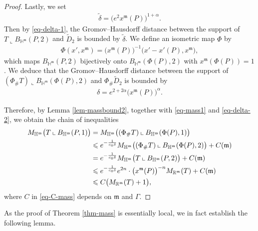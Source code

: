 \documentclass[11pt,reqno]{amsart}
\newcommand{\fm}{\mathfrak{m}}
\renewcommand{\leq}{\leqslant}
\theoremstyle{definition}
\numberwithin{equation}{section}
\begin{document}
\begin{proof}
    Lastly, we set
    \begin{align}
        \tilde \delta = \bigl(e^2 x^\fm(P)\bigr)^{1+\alpha}.
    \end{align}
    Then by \eqref{eq-delta-1}, the Gromov–Hausdorff distance between the support of $T \mathbin{\llcorner} B_{\mathbb{H}^\fm}(P, 2)$ and $\tilde D_2$ is bounded by $\tilde \delta$. We define an isometric map $\Phi$ by
    \begin{align}\label{eq-phi}
        \Phi (x', x^\fm) = \bigl(x^\fm(P)\bigr)^{-1}\bigl(x' - x'(P), x^\fm\bigr),
    \end{align}
    which maps $B_{\mathbb{H}^\fm}(P,2)$ bijectively onto $B_{\mathbb{H}^\fm}(\Phi(P),2)$ with $x^\fm(\Phi(P))=1$. We deduce that the Gromov–Hausdorff distance between the support of $(\Phi_\# T) \mathbin{\llcorner} B_{\mathbb{H}^\fm}(\Phi(P), 2)$ and $\Phi_\# \tilde D_2$ is bounded by
    \begin{align}\label{eq-delta-2}
        \delta = e^{2+2\alpha}\bigl(x^\fm(P)\bigr)^{\alpha}.
    \end{align}
    
    Therefore, by Lemma \ref{lem-massbound2}, together with \eqref{eq-mass1} and \eqref{eq-delta-2}, we obtain the chain of inequalities
    \begin{align}
        M_{\mathbb{H}^\fm}\bigl(T \mathbin{\llcorner} B_{\mathbb{H}^\fm}(P, 1)\bigr) & = M_{\mathbb{H}^\fm}\bigl((\Phi_\# T) \mathbin{\llcorner} B_{\mathbb{H}^\fm}(\Phi(P), 1)\bigr) \notag \\
        &\leq e^{-\frac{1}{c_0\delta}} M_{\mathbb{H}^\fm}\bigl((\Phi_\# T) \mathbin{\llcorner} B_{\mathbb{H}^\fm}(\Phi(P), 2)\bigr) + C(\fm) \notag \\
        &= e^{-\frac{1}{c_0\delta}} M_{\mathbb{H}^\fm}\bigl(T \mathbin{\llcorner} B_{\mathbb{H}^\fm}(P, 2)\bigr) + C(\fm) \notag \\
        &\leq e^{-\frac{1}{c_0\delta}} e^{2n}\cdot \bigl(x^\fm(P)\bigr)^{-n} M_{\mathbb{R}^\fm}(T) + C(\fm) \notag \\
        &\leq C\bigl(M_{\mathbb{R}^\fm}(T) +1\bigr),\label{eq-C-mass}
    \end{align}
    where $C$ in \eqref{eq-C-mass} depends on $\fm$ and $\Gamma$.
\end{proof}

As the proof of Theorem \ref{thm-mass} is essentially local, we in fact establish the following lemma.
\end{document}
